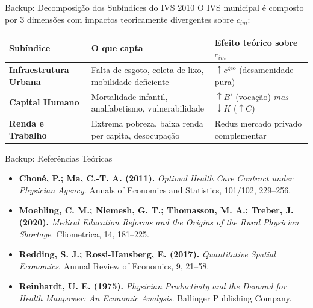 \documentclass[aspectratio=169, 10pt]{beamer}
\begin{document}
\appendix

\begin{frame}{Backup: Decomposição dos Subíndices do IVS 2010}
  O IVS municipal é composto por 3 dimensões com impactos teoricamente divergentes sobre $c_{im}$:

  \vspace{0.3cm}
  \begin{table}[h]
    \centering
    \small
    \begin{tabular}{lp{5.6cm}l}
      \toprule
      \textbf{Subíndice} & \textbf{O que capta} & \textbf{Efeito teórico sobre $c_{im}$} \\
      \midrule
      \textbf{Infraestrutura Urbana} & Falta de esgoto, coleta de lixo, mobilidade deficiente & $\uparrow c^{\text{geo}}$ (desamenidade pura) \\
      \textbf{Capital Humano} & Mortalidade infantil, analfabetismo, vulnerabilidade & $\uparrow B'$ (vocação) \emph{mas} $\downarrow K$ ($\uparrow C$) \\
      \textbf{Renda e Trabalho} & Extrema pobreza, baixa renda per capita, desocupação & Reduz mercado privado complementar \\
      \bottomrule
    \end{tabular}
  \end{table}
\end{frame}

\begin{frame}{Backup: Referências Teóricas}
  \begin{itemize}
    \item \textbf{Choné, P.; Ma, C.-T. A. (2011).} \emph{Optimal Health Care Contract under Physician Agency}. Annals of Economics and Statistics, 101/102, 229--256.
    \item \textbf{Moehling, C. M.; Niemesh, G. T.; Thomasson, M. A.; Treber, J. (2020).} \emph{Medical Education Reforms and the Origins of the Rural Physician Shortage}. Cliometrica, 14, 181--225.
    \item \textbf{Redding, S. J.; Rossi-Hansberg, E. (2017).} \emph{Quantitative Spatial Economics}. Annual Review of Economics, 9, 21--58.
    \item \textbf{Reinhardt, U. E. (1975).} \emph{Physician Productivity and the Demand for Health Manpower: An Economic Analysis}. Ballinger Publishing Company.
  \end{itemize}
\end{frame}
\end{document}
